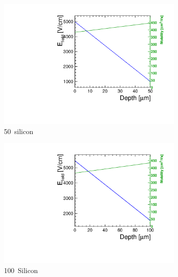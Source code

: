 \begin{figure}[htbp]
  \centering
  \begin{subfigure}[b]{0.33\textwidth}
    \centering
    \includegraphics[width=\textwidth]{figures/ChargeSharing/Efield_mob_A06.pdf}
    \caption{50~\micron silicon}\label{fig:Mob_Efield_A06}
  \end{subfigure}\hfill
  \begin{subfigure}[b]{0.33\textwidth}
    \centering
    \includegraphics[width=\textwidth]{figures/ChargeSharing/Efield_mob_L04.pdf}
    \caption{100~\micron Silicon}\label{fig:Mob_Efield_L04}
  \end{subfigure} \hfill
  \begin{subfigure}[b]{0.33\textwidth}
    \centering

\end{subfigure}
\end{figure}
